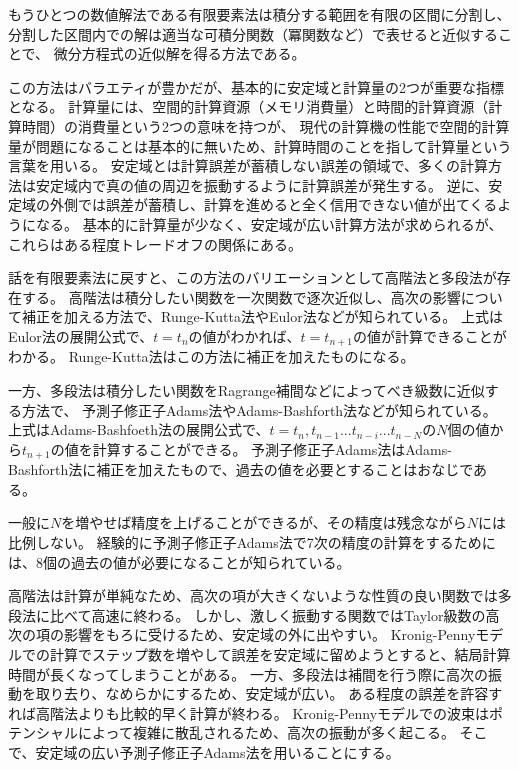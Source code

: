 \documentclass[autodetect-engine,dvipdfmx-if-dvi,ja=standard,a4paper,layout=v2]{bxjsreport}
\begin{document}
    もうひとつの数値解法である有限要素法は積分する範囲を有限の区間に分割し、
    分割した区間内での解は適当な可積分関数（冪関数など）で表せると近似することで、
    微分方程式の近似解を得る方法である。\par
    この方法はバラエティが豊かだが、基本的に安定域と計算量の2つが重要な指標となる。
    計算量には、空間的計算資源（メモリ消費量）と時間的計算資源（計算時間）の消費量という2つの意味を持つが、
    現代の計算機の性能で空間的計算量が問題になることは基本的に無いため、計算時間のことを指して計算量という言葉を用いる。
    安定域とは計算誤差が蓄積しない誤差の領域で、多くの計算方法は安定域内で真の値の周辺を振動するように計算誤差が発生する。
    逆に、安定域の外側では誤差が蓄積し、計算を進めると全く信用できない値が出てくるようになる。
    基本的に計算量が少なく、安定域が広い計算方法が求められるが、これらはある程度トレードオフの関係にある。\par
    話を有限要素法に戻すと、この方法のバリエーションとして高階法と多段法が存在する。
    高階法は積分したい関数を一次関数で逐次近似し、高次の影響について補正を加える方法で、Runge-Kutta法やEulor法などが知られている。
    上式はEulor法の展開公式で、$t=t_n$の値がわかれば、$t=t_{n+1}$の値が計算できることがわかる。
    Runge-Kutta法はこの方法に補正を加えたものになる。\par
    一方、多段法は積分したい関数をRagrange補間などによってべき級数に近似する方法で、
    予測子修正子Adams法やAdams-Bashforth法などが知られている。
    上式はAdams-Bashfoeth法の展開公式で、$t=t_n,t_{n-1}...t_{n-i}...t_{n-N}$の$N$個の値から$t_{n+1}$の値を計算することができる。
    予測子修正子Adams法はAdams-Bashforth法に補正を加えたもので、過去の値を必要とすることはおなじである。\par
    一般に$N$を増やせば精度を上げることができるが、その精度は残念ながら$N$には比例しない。
    経験的に予測子修正子Adams法で7次の精度の計算をするためには、8個の過去の値が必要になることが知られている。\par
    高階法は計算が単純なため、高次の項が大きくないような性質の良い関数では多段法に比べて高速に終わる。
    しかし、激しく振動する関数ではTaylor級数の高次の項の影響をもろに受けるため、安定域の外に出やすい。
    Kronig-Pennyモデルでの計算でステップ数を増やして誤差を安定域に留めようとすると、結局計算時間が長くなってしまうことがある。
    一方、多段法は補間を行う際に高次の振動を取り去り、なめらかにするため、安定域が広い。
    ある程度の誤差を許容すれば高階法よりも比較的早く計算が終わる。
    Kronig-Pennyモデルでの波束はポテンシャルによって複雑に散乱されるため、高次の振動が多く起こる。
    そこで、安定域の広い予測子修正子Adams法を用いることにする。
\end{document}
